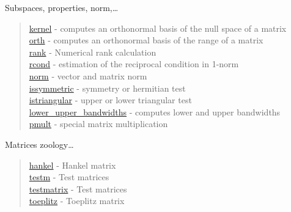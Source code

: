 Subspaces, properties, norm,\dots

\begin{quote}
\noindent
\hyperlink{kernel}{kernel} - computes an orthonormal basis of the null space of a matrix\\
\hyperlink{orth}{orth} - computes an orthonormal basis of the range of a matrix\\
\hyperlink{rank}{rank} - Numerical rank calculation \\
\hyperlink{rcond}{rcond} - estimation of the reciprocal condition in 1-norm\\
\hyperlink{norm}{norm} - vector and matrix norm\\
\hyperlink{issymmetric}{issymmetric} - symmetry or hermitian test\\
\hyperlink{istriangular}{istriangular} - upper or lower triangular test\\
\hyperlink{lower_upper_bandwidths}{lower\_upper\_bandwidths} - computes lower and upper bandwidths\\
\hyperlink{pmult}{pmult} - special matrix multiplication\\
\end{quote}

Matrices zoology\dots

\begin{quote}
\noindent
\hyperlink{hankel}{hankel} - Hankel matrix \\
\hyperlink{testm}{testm} - Test matrices  \\
\hyperlink{testmatrix}{testmatrix} - Test matrices  \\
\hyperlink{toeplitz}{toeplitz} - Toeplitz matrix \\

\end{quote}

 
 
 
 
 

 







 
 
 
 
 
 




